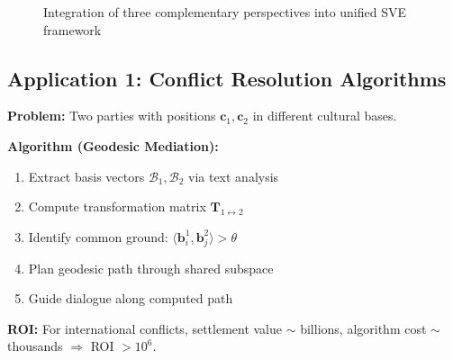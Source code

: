 \documentclass[11pt,a4paper]{article}
\theoremstyle{definition}
\theoremstyle{remark}
\newcommand{\bb}{\mathbf{b}}
\newcommand{\cc}{\mathbf{c}}
\newcommand{\TT}{\mathbf{T}}
\begin{document}
\begin{figure}[h]
\centering
{}
\caption{Integration of three complementary perspectives into unified SVE framework}
\end{figure}

\subsection{Application 1: Conflict Resolution Algorithms}

\textbf{Problem:} Two parties with positions $\cc_1, \cc_2$ in different cultural bases.

\textbf{Algorithm (Geodesic Mediation):}

\begin{enumerate}[label=\textbf{Step \arabic*:}]
\item Extract basis vectors $\mathcal{B}_1, \mathcal{B}_2$ via text analysis
\item Compute transformation matrix $\TT_{1 \leftrightarrow 2}$
\item Identify common ground: $\langle \bb_i^1, \bb_j^2 \rangle > \theta$
\item Plan geodesic path through shared subspace
\item Guide dialogue along computed path
\end{enumerate}

\textbf{ROI:} For international conflicts, settlement value $\sim$ billions, algorithm cost $\sim$ thousands $\Rightarrow$ ROI $> 10^6$.
\end{document}

